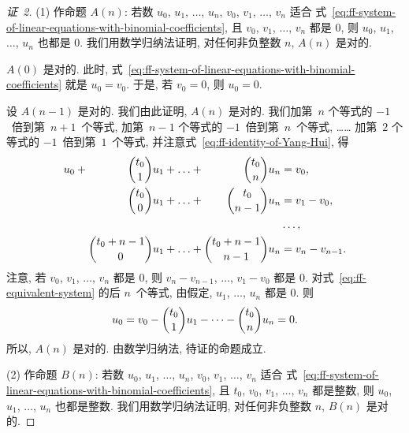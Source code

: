 \documentclass[../libro.tex]{subfiles}
\begin{document}
\begin{proof}[证~2]
    (1)
    作命题 \(A(n)\):
    若数 \(u_0\), \(u_1\), \(\dots\), \(u_n\),
    \(v_0\), \(v_1\), \(\dots\), \(v_n\)
    适合%
    式~\eqref{eq:ff-system-of-linear-equations-with-binomial-coefficients},
    且 \(v_0\), \(v_1\), \(\dots\), \(v_n\) 都是 \(0\),
    则 \(u_0\), \(u_1\), \(\dots\), \(u_n\) 也都是 \(0\).
    我们用数学归纳法证明, 对任何非负整数 \(n\),
    \(A(n)\) 是对的.

    \(A(0)\) 是对的.
    此时, 式~\eqref{eq:ff-system-of-linear-equations-with-binomial-coefficients}
    就是 \(u_0 = v_0\).
    于是, 若 \(v_0 = 0\), 则 \(u_0 = 0\).

    设 \(A(n-1)\) 是对的.
    我们由此证明, \(A(n)\) 是对的.
    我们加第~\(n\) 个等式的 \(-1\)~倍到第~\(n+1\)~个等式,
    加第~\(n-1\) 个等式的 \(-1\)~倍到第~\(n\)~个等式,
    ……
    加第~\(2\) 个等式的 \(-1\)~倍到第~\(1\)~个等式,
    并注意式~\eqref{eq:ff-identity-of-Yang-Hui},
    得
    \begin{equation}
        \begin{alignedat}{7}
            u_0 & {} +  {} & \dbinom{t_0}{1} u_1     & {} + {} & \dots & {} + {} & \dbinom{t_0}{n} u_n       & {} = v_0,           \\
            {}  & {} {} {} & \dbinom{t_0}{0} u_1     & {} + {} & \dots & {} + {} & \dbinom{t_0}{n-1} u_n     & {} = v_1 - v_0,     \\
            {}  &          &                         &         &       &         &                           & \dots,              \\
            {}  & {} {} {} & \dbinom{t_0+n-1}{0} u_1 & {} + {} & \dots & {} + {} & \dbinom{t_0+n-1}{n-1} u_n & {} = v_n - v_{n-1}.
        \end{alignedat}
        \label{eq:ff-equivalent-system}
    \end{equation}
    注意, 若 \(v_0\), \(v_1\), \(\dots\), \(v_n\) 都是 \(0\),
    则 \(v_n - v_{n-1}\), \(\dots\), \(v_1 - v_0\) 都是 \(0\).
    对式~\eqref{eq:ff-equivalent-system} 的后 \(n\)~个等式,
    由假定, \(u_1\), \(\dots\), \(u_n\) 都是 \(0\).
    则
    \begin{align*}
        u_0 = v_0 - \dbinom{t_0}{1} u_1 - \dots - \dbinom{t_0}{n} u_n = 0.
    \end{align*}
    所以, \(A(n)\) 是对的.
    由数学归纳法, 待证的命题成立.

    (2)
    作命题 \(B(n)\):
    若数 \(u_0\), \(u_1\), \(\dots\), \(u_n\),
    \(v_0\), \(v_1\), \(\dots\), \(v_n\)
    适合%
    式~\eqref{eq:ff-system-of-linear-equations-with-binomial-coefficients},
    且 \(t_0\), \(v_0\), \(v_1\), \(\dots\), \(v_n\) 都是整数,
    则 \(u_0\), \(u_1\), \(\dots\), \(u_n\) 也都是整数.
    我们用数学归纳法证明, 对任何非负整数 \(n\),
    \(B(n)\) 是对的.


\end{proof}
\end{document}

